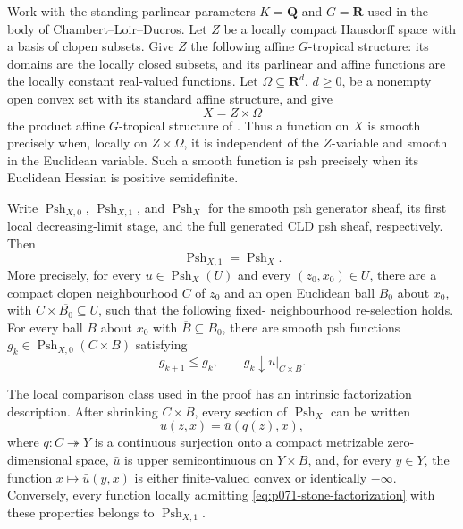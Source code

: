 
Work with the standing parlinear parameters
\(K=\mathbf Q\) and \(G=\mathbf R\) used in the body of
Chambert--Loir--Ducros.  Let \(Z\) be a locally compact Hausdorff space
with a basis of clopen subsets.  Give
\(Z\) the following affine \(G\)-tropical structure: its domains are the
locally closed subsets, and its parlinear and affine functions are the
locally constant real-valued functions.  Let
\(\Omega\subseteq\mathbf R^d\), \(d\geq0\), be a nonempty open convex set
with its
standard affine structure, and give
\[
                         X=Z\times\Omega
\]
the product affine \(G\)-tropical structure of
\cite[\S\S9.1.1--9.1.4]{CLD25}.  Thus a function on \(X\) is smooth precisely when,
locally on \(Z\times\Omega\), it is independent of the \(Z\)-variable and
smooth in the Euclidean variable.  Such a smooth function is psh precisely
when its Euclidean Hessian is positive semidefinite.

Write \(\operatorname{Psh}_{X,0}\),
\(\operatorname{Psh}_{X,1}\), and \(\operatorname{Psh}_X\) for the smooth
psh generator sheaf, its first local decreasing-limit stage, and the full
generated CLD psh sheaf, respectively.  Then
\begin{equation}
\label{eq:p071-stone-collapse}
                    \operatorname{Psh}_{X,1}
                    =\operatorname{Psh}_X.
\end{equation}
More precisely, for every \(u\in\operatorname{Psh}_X(U)\) and every
\((z_0,x_0)\in U\), there are a compact clopen neighbourhood \(C\) of
\(z_0\) and an open Euclidean ball \(B_0\) about \(x_0\), with
\(C\times\overline{B_0}\subseteq U\), such that the following fixed-
neighbourhood re-selection holds.  For every ball \(B\) about \(x_0\) with
\(\overline B\subseteq B_0\), there are smooth psh functions
\(g_k\in\operatorname{Psh}_{X,0}(C\times B)\) satisfying
\begin{equation}
\label{eq:p071-stone-fixed-neighbourhood}
                          g_{k+1}\leq g_k,
             \qquad      g_k\downarrow u|_{C\times B}.
\end{equation}

The local comparison class used in the proof has an intrinsic
factorization description.  After shrinking \(C\times B\), every section
of \(\operatorname{Psh}_X\) can be written
\begin{equation}
\label{eq:p071-stone-factorization}
             u(z,x)=\bar u(q(z),x),
\end{equation}
where \(q:C\twoheadrightarrow Y\) is a continuous surjection onto a compact
metrizable zero-dimensional space, \(\bar u\) is upper semicontinuous on
\(Y\times B\), and, for every \(y\in Y\), the function
\(x\mapsto\bar u(y,x)\) is either finite-valued convex or identically
\(-\infty\).  Conversely, every function locally admitting
\eqref{eq:p071-stone-factorization} with these properties belongs to
\(\operatorname{Psh}_{X,1}\).

